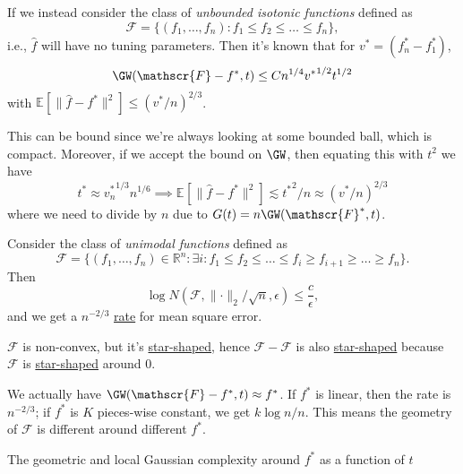 \begin{eg}
	If we instead consider the class of \emph{unbounded isotonic functions} defined as
	\[
		\mathscr{F} = \{(f_1, \dots , f_n) \colon f_1 \leq f_2 \leq \dots \leq f_n \},
	\]
	i.e., \(\hat{f} \) will have no tuning parameters. Then it's known that for \(v^{\ast} = (f^{\ast} _n - f^{\ast} _1)\),
	\[
		\GW(\mathscr{F} - f^{\ast} , t) \leq C n^{1 / 4} {v^{\ast} }^{1 / 2} t^{1 / 2}
	\]
	with \(\mathbb{E}_{}[\lVert \hat{f} - f^{\ast}  \rVert ^2 ] \leq (v^{\ast} / n)^{2 / 3}\).
\end{eg}
\begin{explanation}
	This can be bound since we're always looking at some bounded ball, which is compact. Moreover, if we accept the bound on \(\GW\), then equating this with \(t^2\) we have
	\[
		t^{\ast} \approx {v^{\ast} _n}^{1 / 3} n^{1 / 6}
		\implies \mathbb{E}_{}\left[\lVert \hat{f} - f^{\ast} \rVert ^2 \right] \lesssim {t^{\ast} }^2 / n \approx (v^{\ast} / n)^{2 / 3}
	\]
	where we need to divide by \(n\) due to \(G(t) = n \GW(\mathscr{F} ^{\ast} , t)\).
\end{explanation}

\begin{eg}
	Consider the class of \emph{unimodal functions} defined as
	\[
		\mathscr{F} = \{ (f_1, \dots , f_n) \in \mathbb{R} ^n \colon \exists i \colon f_1 \leq f_2 \leq \dots \leq f_i \geq f_{i+1} \geq \dots \geq f_n \}.
	\]
	Then
	\[
		\log N(\mathscr{F} , \lVert \cdot \rVert _2 / \sqrt{n} , \epsilon ) \leq \frac{c}{\epsilon },
	\]
	and we get a \(n^{-2 / 3}\) \hyperref[def:rate-of-convergence]{rate} for mean square error.
\end{eg}
\begin{explanation}
	\(\mathscr{F} \) is non-convex, but it's \hyperref[def:star-shaped]{star-shaped}, hence \(\mathscr{F} - \mathscr{F} \) is also \hyperref[def:star-shaped]{star-shaped} because \(\mathscr{F} \) is \hyperref[def:star-shaped]{star-shaped} around \(0\).
\end{explanation}

\begin{remark}
	We actually have \(\GW(\mathscr{F} - f^{\ast} , t) \approx f^{\ast} \). If \(f^{\ast} \) is linear, then the rate is \(n^{-2 / 3}\); if \(f^{\ast} \) is \(K\) pieces-wise constant, we get \(k \log n / n\). This means the geometry of \(\mathscr{F} \) is different around different \(f^{\ast} \).
\end{remark}

The geometric and local Gaussian complexity around \(f^{\ast} \) as a function of \(t\)
